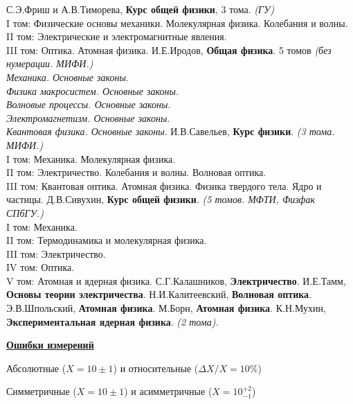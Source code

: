 \documentclass[12pt,epsfig,color,russian]{article}
\begin{document}
\newpage
\sf\Large
\begin{thebibliography}{99}
С.Э.Фриш и А.В.Тиморева, {\bf Курс общей физики}, 3 тома. {\sl\large (ГУ)}\\
{\large
I том: Физические основы механики. Молекулярная физика. Колебания и волны.\\
II том: Электрические и электромагнитные явления.\\
III том: Оптика. Атомная физика.
}
И.Е.Иродов, {\bf Общая физика}. 5 томов {\sl\large (без нумерации. МИФИ.)}\\
{\large
{\sl Механика. Основные законы}.\\
{\sl Физика макросистем. Основные законы}.\\
{\sl Волновые процессы. Основные законы}.\\
{\sl Электромагнетизм. Основные законы}.\\
{\sl Квантовая физика. Основные законы}.
}
И.В.Савельев, {\bf Курс физики}. {\sl\large (3 тома. МИФИ.)}\\
{\large
I том: Механика. Молекулярная физика. \\
II том: Электричество. Колебания и волны. Волновая оптика.\\
III том: Квантовая оптика. Атомная физика. Физика твердого тела. Ядро и частицы.
}
Д.В.Сивухин, {\bf Курс общей физики}.  {\sl\large (5 томов. МФТИ, Физфак СПбГУ.)}\\
{\large
I том: Механика.\\
II том: Термодинамика и молекулярная физика. \\
III том: Электричество. \\
IV том: Оптика.\\
V том: Атомная и ядерная физика.
}
С.Г.Калашников, {\bf Электричество}.
И.Е.Тамм, {\bf Основы теории электричества}.
Н.И.Калитеевский, {\bf Волновая оптика}.
Э.В.Шпольский, {\bf Атомная физика}.
М.Борн, {\bf Атомная физика}.
К.Н.Мухин,  {\bf Экспериментальная ядерная физика}. {\sl\large (2 тома).}
\end{thebibliography}
\newpage
 \centerline{\underline{\huge\bf Ошибки измерений}}\vspace{5mm}

 Абсолютные ($X =10\pm1$) и относительные ($\Delta X/X=10\%$)\vspace{4mm}

 Симметричные ($X =10\pm1$) и асимметричные ($X=10^{+2}_{-1}$)\vspace{4mm}
\end{document}
